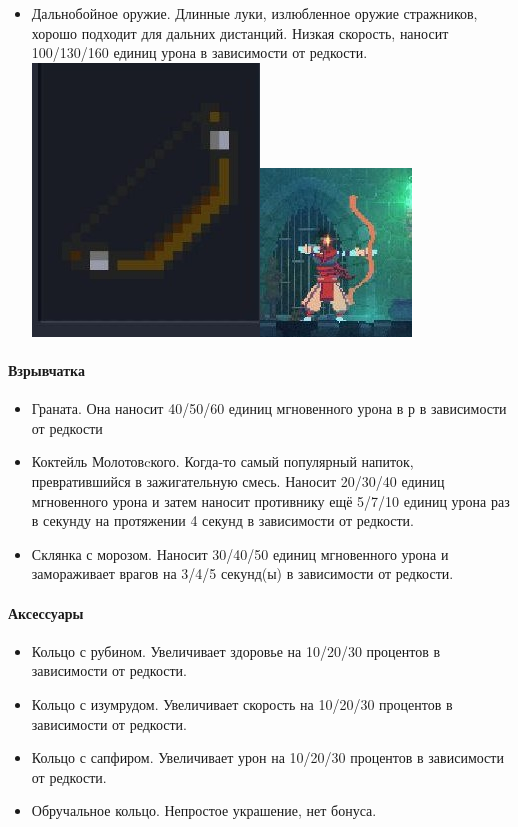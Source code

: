 \documentclass{article}
\begin{document}
\begin{itemize}
\item Дальнобойное оружие.
Длинные луки, излюбленное оружие стражников, хорошо подходит для дальних дистанций.  Низкая скорость, наносит 100/130/160 единиц урона в зависимости от редкости.\\
\includegraphics[width=0.2\linewidth]{images/dd_luk.jpg}\hspace{0.5cm}\includegraphics[width=0.22\linewidth]{images/dd_luk2.jpg}
\end{itemize}
\paragraph{Взрывчатка}
\begin{itemize}
\item Граната. Она наносит 40/50/60 единиц мгновенного урона в р в зависимости от редкости
\item Коктейль Молотовcкого. Когда-то самый популярный напиток, превратившийся в зажигательную смесь. Наносит 20/30/40 единиц мгновенного урона и затем наносит противнику ещё 5/7/10 единиц урона раз в секунду на протяжении 4 секунд в зависимости от редкости.
\item Склянка с морозом. Наносит 30/40/50 единиц мгновенного урона и замораживает врагов на 3/4/5 секунд(ы) в зависимости от редкости.

\end{itemize}
\paragraph{Аксессуары}
\begin{itemize}
\item Кольцо с рубином. Увеличивает здоровье на 10/20/30 процентов в зависимости от редкости.
\item Кольцо с изумрудом. Увеличивает скорость на 10/20/30 процентов в зависимости от редкости.
\item Кольцо с сапфиром. Увеличивает урон на 10/20/30 процентов в зависимости от редкости.
\item Обручальное кольцо. Непростое украшение, нет бонуса.
\end{itemize}
\end{document}
